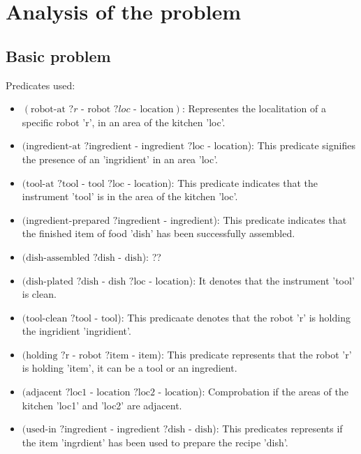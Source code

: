 \section{Analysis of the problem}

\subsection{Basic problem}
Predicates used:
\begin{itemize}
  \item $ (\text{robot-at } ?r \text{ - robot } ?loc \text{ - location}) $: Representes the localitation of a specific robot 'r', in an area of the kitchen 'loc'.
  \item $ (\text{ingredient-at } ?\text{ingredient - ingredient } ?\text{loc - location} $): This predicate signifies the presence of an 'ingridient' in an area 'loc'.
  \item $ (\text{tool-at } ?\text{tool - tool } ?\text{loc - location} $): This predicate indicates that the instrument 'tool' is in the area of the kitchen 'loc'.
  \item $ (\text{ingredient-prepared } ?\text{ingredient - ingredient} $): This predicate indicates that the finished item of food 'dish' has been successfully assembled.
  \item $ (\text{dish-assembled } ?\text{dish - dish} $): ??
  \item $ (\text{dish-plated } ?\text{dish - dish } ?\text{loc - location} $): It denotes that the instrument 'tool' is clean.
  \item $ (\text{tool-clean } ?\text{tool - tool} $): This predicaate denotes that the robot 'r' is holding the ingridient 'ingridient'.
  \item $ (\text{holding } ?\text{r - robot } ?\text{item - item} $): This predicate represents that the robot 'r' is holding 'item', it can be a tool or an ingredient.
  \item $ (\text{adjacent } ?\text{loc1 - location } ?\text{loc2 - location} $): Comprobation if the areas of the kitchen 'loc1' and 'loc2' are adjacent.
  \item $ (\text{used-in } ?\text{ingredient - ingredient } ?\text{dish - dish} $): This predicates represents if the item 'ingrdient' has been used to prepare the recipe 'dish'.
\end{itemize}